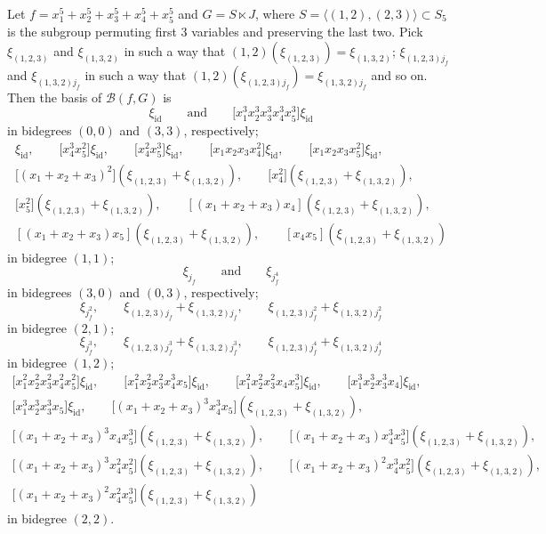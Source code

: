\documentclass[pdftex]{sigma}
\numberwithin{equation}{section}
\newcommand{\id}{\mathrm{id}}
\def\B{{\mathcal B}}
\begin{document}
\begin{Example}
Let $f=x_1^5+x_2^5+x_3^5+x_4^5+x_5^5$ and $G=S\ltimes J$, where $S=\langle (1,2), (2,3)\rangle\subset S_5$ is the subgroup permuting first 3 variables and preserving the last two. Pick $\xi_{(1,2,3)}$ and $\xi_{(1,3,2)}$ in such a way that $(1,2)(\xi_{(1,2,3)})=\xi_{(1,3,2)}$; $\xi_{(1,2,3)j_f}$ and $\xi_{(1,3,2)j_f}$ in such a way that $(1,2)(\xi_{(1,2,3)j_f})=\xi_{(1,3,2)j_f}$ and so on. Then the basis of $\B(f,G)$ is
\[
\xi_{\id} \qquad \text{and} \qquad \bigl[x_1^3x_2^3x_3^3x_4^3x_5^3\bigr]\xi_{\id}
\]
in bidegrees $(0,0)$ and $(3,3)$, respectively;
\begin{gather*}
[x_1x_2x_3x_4x_5]\xi_{\id},\qquad\bigl[x_4^3x_5^2\bigr]\xi_{\id},\qquad\bigl[x_4^2x_5^3\bigr]\xi_{\id}, \qquad\bigl[x_1x_2x_3x_4^2\bigr]\xi_{\id},\qquad \bigl[x_1x_2x_3x_5^2\bigr]\xi_{\id},\\
\bigl[(x_1+x_2+x_3)^2\bigr](\xi_{(1,2,3)}+\xi_{(1,3,2)}),\qquad
\bigl[x_4^2\bigr](\xi_{(1,2,3)}+\xi_{(1,3,2)}),\\ \bigl[x_5^2\bigr](\xi_{(1,2,3)}+\xi_{(1,3,2)}),\qquad
[(x_1+x_2+x_3)x_4](\xi_{(1,2,3)}+\xi_{(1,3,2)}),\\ [(x_1+x_2+x_3)x_5](\xi_{(1,2,3)}+\xi_{(1,3,2)}),\qquad [x_4x_5](\xi_{(1,2,3)}+\xi_{(1,3,2)})
\end{gather*}
in bidegree $(1,1)$;
\[
\xi_{j_f} \qquad \text{and} \qquad \xi_{j_f^4}
\]
in bidegrees $(3,0)$ and $(0,3)$, respectively;
\[
\xi_{j_f^2}, \qquad \xi_{(1,2,3)j_f}+\xi_{(1,3,2)j_f}, \qquad \xi_{(1,2,3)j_f^2}+\xi_{(1,3,2)j_f^2}
\]
in bidegree $(2,1)$;
\[
\xi_{j_f^3}, \qquad \xi_{(1,2,3)j_f^3}+\xi_{(1,3,2)j_f^3}, \qquad \xi_{(1,2,3)j_f^4}+\xi_{(1,3,2)j_f^4}
\]
in bidegree $(1,2)$;
\begin{gather*}
\bigl[x_1^2x_2^2x_3^2x_4^2x_5^2\bigr]\xi_{\id},\qquad \bigl[x_1^2x_2^2x_3^2x_4^3x_5\bigr]\xi_{\id},\qquad\bigl[x_1^2x_2^2x_3^2x_4x_5^3\bigr]\xi_{\id}, \qquad\bigl[x_1^3x_2^3x_3^3x_4\bigr]\xi_{\id},\\
\bigl[x_1^3x_2^3x_3^3x_5\bigr]\xi_{\id},\qquad
\bigl[(x_1+x_2+x_3)^3x_4^3x_5\bigr](\xi_{(1,2,3)}+\xi_{(1,3,2)}),\\
\bigl[(x_1+x_2+x_3)^3x_4x_5^3\bigr](\xi_{(1,2,3)}+\xi_{(1,3,2)}),\qquad
\bigl[(x_1+x_2+x_3)x_4^3x_5^3\bigr](\xi_{(1,2,3)}+\xi_{(1,3,2)}),\\
\bigl[(x_1+x_2+x_3)^3x_4^2x_5^2\bigr](\xi_{(1,2,3)}+\xi_{(1,3,2)}),\qquad \bigl[(x_1+x_2+x_3)^2x_4^3x_5^2\bigr](\xi_{(1,2,3)}+\xi_{(1,3,2)}),\\ \bigl[(x_1+x_2+x_3)^2x_4^2x_5^3\bigr](\xi_{(1,2,3)}+\xi_{(1,3,2)})
\end{gather*}
in bidegree $(2,2)$.


\end{Example}
\end{document}
